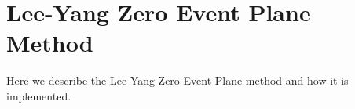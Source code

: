 \section{Lee-Yang Zero Event Plane Method}
\label{LYZEP}
Here we describe the Lee-Yang Zero Event Plane method and how it is implemented.
